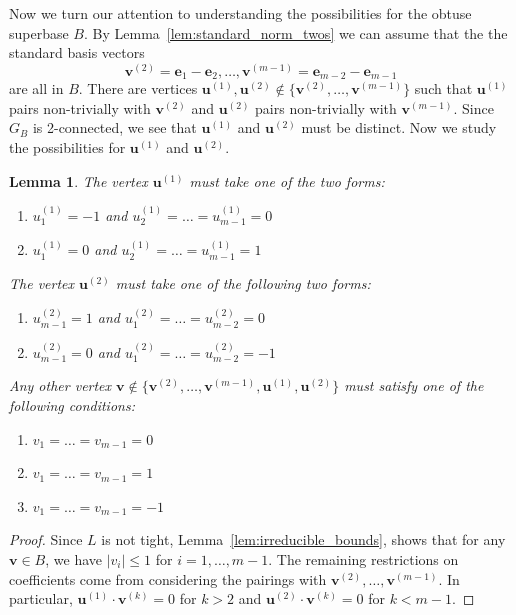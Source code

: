 \documentclass{amsart} %
\newcommand{\e}{\bm{e}}
\newcommand{\bv}{\bm{v}}
\newcommand{\bu}{\bm{u}}
\theoremstyle{thm}
\newtheorem{lem}[Theorem]{Lemma}
\theoremstyle{definition}
\numberwithin{equation}{section}
\begin{document}
Now we turn our attention to understanding the possibilities for the obtuse superbase $B$. By Lemma~\ref{lem:standard_norm_twos} we can assume that the the standard basis vectors 
\[\bv^{(2)}=\e_1-\e_2, \dots, \bv^{(m-1)}=\e_{m-2}-\e_{m-1}\]
are all in $B$. There are vertices $\bu^{(1)},\bu^{(2)}\not\in\{\bv^{(2)}, \dots, \bv^{(m-1)}\}$ such that $\bu^{(1)}$ pairs non-trivially with $\bv^{(2)}$ and $\bu^{(2)}$ pairs non-trivially with $\bv^{(m-1)}$. Since $G_B$ is 2-connected, we see that $\bu^{(1)}$ and $\bu^{(2)}$ must be distinct. Now we study the possibilities for $\bu^{(1)}$ and $\bu^{(2)}$.
\begin{lem}
The vertex $\bu^{(1)}$ must take one of the two forms:
\begin{enumerate}
    \item [(A1)] $u^{(1)}_1=-1$ and $u^{(1)}_2=\dots =u^{(1)}_{m-1}= 0$
    \item [(A2)] $u^{(1)}_1=0$ and $u^{(1)}_2=\dots =u^{(1)}_{m-1}= 1$
\end{enumerate}
The vertex $\bu^{(2)}$ must take one of the following two forms:
\begin{enumerate}
    \item [(B1)] $u^{(2)}_{m-1}=1$ and $u^{(2)}_1=\dots =u^{(2)}_{m-2}= 0$
    \item [(B2)] $u^{(2)}_{m-1}=0$ and $u^{(2)}_1=\dots =u^{(2)}_{m-2}= -1$
\end{enumerate}
Any other vertex $\bv\not\in\{\bv^{(2)},\dots, \bv^{(m-1)}, \bu^{(1)},\bu^{(2)}\}$ must satisfy one of the following conditions:
\begin{enumerate}
    \item [(C1)] $v_1=\dots =v_{m-1}= 0$
    \item [(C2)] $v_1=\dots =v_{m-1}= 1$
    \item [(C3)] $v_1=\dots =v_{m-1}= -1$ 
\end{enumerate}
\end{lem}
\begin{proof}
Since $L$ is not tight, Lemma~\ref{lem:irreducible_bounds}, shows that for any $\bv\in B$, we have $|v_i|\leq 1$ for $i=1, \dots, m-1$. The remaining restrictions on coefficients come from considering the pairings with $\bv^{(2)}, \dots, \bv^{(m-1)}$. In particular, $\bu^{(1)}\cdot \bv^{(k)}=0$ for $k>2$ and $\bu^{(2)}\cdot \bv^{(k)}=0$ for $k<m-1$.
\end{proof}
\end{document}

